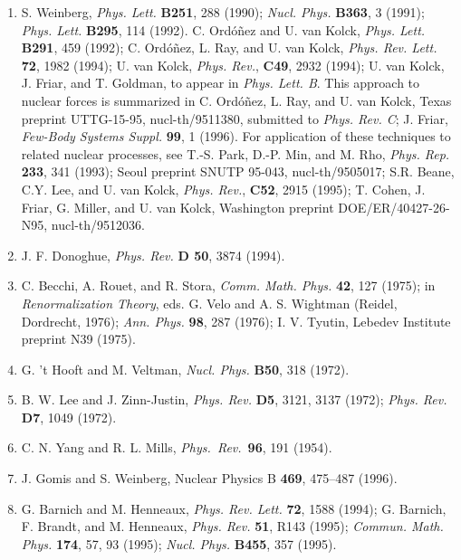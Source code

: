\documentclass[12pt]{article}
\begin{document}
\begin{enumerate}
\item S. Weinberg, {\em Phys. Lett.} {\bf B251}, 288 (1990);
{\em Nucl. Phys.} {\bf B363}, 3 (1991);  {\em Phys. Lett.}
{\bf B295}, 114 (1992).  C. Ord\'o\~nez and U. van Kolck,
{\em Phys. Lett.} {\bf B291}, 459 (1992); C. Ord\'o\~nez, L.
Ray, and U. van Kolck, {\em Phys. Rev. Lett.} {\bf 72}, 1982
(1994); U. van Kolck, {\em Phys. Rev.}, {\bf C49}, 2932
(1994); U. van Kolck, J. Friar, and T. Goldman, to appear in
{\em Phys. Lett. B}.   This approach to nuclear forces is
summarized in C. Ord\'o\~nez, L. Ray, and U. van Kolck,
Texas preprint UTTG-15-95, nucl-th/9511380, submitted to
{\em Phys. Rev. C}; J. Friar,
{\em Few-Body Systems Suppl.} {\bf 99}, 1 (1996).   For
application of these techniques to related nuclear
processes, see T.-S. Park, D.-P. Min, and M. Rho, {\em Phys.
Rep.} {\bf 233}, 341 (1993); Seoul preprint SNUTP 95-043,
nucl-th/9505017; S.R. Beane, C.Y. Lee, and U. van Kolck,
{\em Phys. Rev.}, {\bf C52}, 2915 (1995); T. Cohen, J.
Friar, G. Miller, and U. van Kolck, Washington preprint
DOE/ER/40427-26-N95, nucl-th/9512036.

\item J. F. Donoghue, {\it Phys. Rev.} {\bf D 50}, 3874
(1994).

\item C. Becchi, A. Rouet, and R. Stora, {\it Comm. Math.
Phys.} {\bf 42}, 127 (1975); in {\em Renormalization
Theory}, eds. G. Velo and A. S. Wightman (Reidel, Dordrecht,
1976); {\it Ann. Phys.} {\bf 98}, 287 (1976); I. V. Tyutin,
Lebedev Institute preprint N39 (1975).

\item G. 't Hooft and M. Veltman, {\it Nucl.
Phys.} {\bf B50}, 318 (1972).

\item B. W. Lee and J. Zinn-Justin, {\it Phys.
Rev.} {\bf D5}, 3121, 3137 (1972); {\it Phys. Rev.} {\bf
D7}, 1049 (1972).

\item C. N. Yang and R. L. Mills, {\it Phys.~Rev.}~{\bf 96},
191 (1954).

\item J. Gomis and S. Weinberg, Nuclear Physics B {\bf 469},
475--487 (1996).

\item G. Barnich and M. Henneaux,
{\em Phys. Rev. Lett.} {\bf 72}, 1588 (1994); G. Barnich, F.
Brandt,  and M. Henneaux, {\em Phys. Rev.} {\bf 51}, R143
(1995); {\em Commun. Math. Phys.} {\bf 174}, 57, 93 (1995);
{\em Nucl. Phys.} {\bf B455}, 357 (1995).



\end{enumerate}
\end{document}
